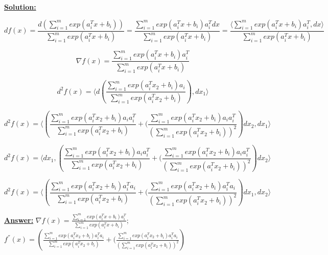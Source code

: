 \underline{\textbf{Solution:}}

\begin{equation*}
    df(x) = \frac{d \left(  \sum\limits_{i=1}^m exp(a^T_ix + b_i) \right)}{\sum\limits_{i=1}^m exp(a^T_ix + b_i)} = \frac{\sum\limits_{i=1}^m exp(a^T_ix + b_i)a^T_idx}{  \sum\limits_{i=1}^m exp(a^T_ix + b_i)} = \frac{\langle\sum\limits_{i=1}^m exp(a^T_ix + b_i)a^T_i, dx \rangle}{\sum\limits_{i=1}^m exp(a^T_ix + b_i)}
\end{equation*}

\begin{equation*}
    \nabla f(x) = \frac{\sum\limits_{i=1}^m exp(a^T_ix + b_i)a^T_i}{\sum\limits_{i=1}^m exp(a^T_ix + b_i)}
\end{equation*}

\begin{equation*}
    d^2f(x) = \langle d\left( \frac{\sum\limits_{i=1}^m exp(a^T_ix_2 + b_i)a_i}{\sum\limits_{i=1}^m exp(a^T_ix_2 + b_i)} \right), dx_1 \rangle
\end{equation*}

\begin{equation*}
    d^2f(x) = \langle \left( \frac{\sum\limits_{i=1}^m exp(a^T_ix_2 + b_i)a_ia^T_i}{\sum\limits_{i=1}^m exp(a^T_ix_2 + b_i)} + ( \frac{\sum\limits_{i=1}^m exp(a^T_ix_2 + b_i)a_ia^T_i}{\left( \sum\limits_{i=1}^m exp(a^T_ix_2 + b_i) \right)^2} \right) dx_2, dx_1 \rangle
\end{equation*}

\begin{equation*}
    d^2f(x) = \langle dx_1, \left( \frac{\sum\limits_{i=1}^m exp(a^T_ix_2 + b_i)a_ia^T_i}{\sum\limits_{i=1}^m exp(a^T_ix_2 + b_i)} + ( \frac{\sum\limits_{i=1}^m exp(a^T_ix_2 + b_i)a_ia^T_i}{\left( \sum\limits_{i=1}^m exp(a^T_ix_2 + b_i) \right)^2} \right) dx_2 \rangle
\end{equation*}

\begin{equation*}
    d^2f(x) = \langle \left( \frac{\sum\limits_{i=1}^m exp(a^T_ix_2 + b_i)a^T_ia_i}{\sum\limits_{i=1}^m exp(a^T_ix_2 + b_i)} + ( \frac{\sum\limits_{i=1}^m exp(a^T_ix_2 + b_i)a^T_ia_i}{\left( \sum\limits_{i=1}^m exp(a^T_ix_2 + b_i) \right)^2} \right)dx_1, dx_2 \rangle
\end{equation*}

\underline{\textbf{Answer:}} $ \nabla f(x) = \frac{\sum\limits_{i=1}^m exp(a^T_ix + b_i)a^T_i}{\sum\limits_{i=1}^m exp(a^T_ix + b_i)}$;
$f^{''}(x) = \left( \frac{\sum\limits_{i=1}^m exp(a^T_ix_2 + b_i)a^T_ia_i}{\sum\limits_{i=1}^m exp(a^T_ix_2 + b_i)} + ( \frac{\sum\limits_{i=1}^m exp(a^T_ix_2 + b_i)a^T_ia_i}{\left( \sum\limits_{i=1}^m exp(a^T_ix_2 + b_i) \right)^2} \right)$



